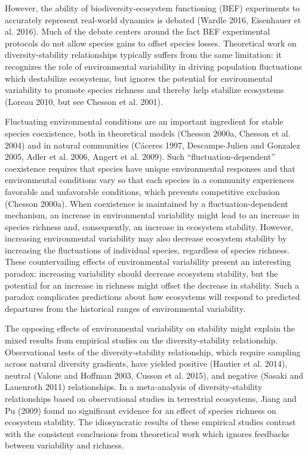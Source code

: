 \documentclass[12pt,]{article}
\begin{document}
However, the ability of biodiversity-ecosystem functioning (BEF)
experiments to accurately represent real-world dynamics is debated
(Wardle 2016, Eisenhauer et al. 2016). Much of the debate centers around
the fact BEF experimental protocols do not allow species gains to offset
species losses. Theoretical work on diversity-stability relationships
typically suffers from the same limitation: it recognizes the role of
environmental variability in driving population fluctuations which
destabilize ecosystems, but ignores the potential for environmental
variability to promote species richness and thereby help stabilize
ecosystems (Loreau 2010, but see Chesson et al. 2001).

Fluctuating environmental conditions are an important ingredient for
stable species coexistence, both in theoretical models (Chesson 2000a,
Chesson et al. 2004) and in natural communities (C{á}ceres 1997,
Descamps-Julien and Gonzalez 2005, Adler et al. 2006, Angert et al.
2009). Such ``fluctuation-dependent'' coexistence requires that species
have unique environmental responses and that environmental conditions
vary so that each species in a community experiences favorable and
unfavorable conditions, which prevents competitive exclusion (Chesson
2000a). When coexistence is maintained by a fluctuation-dependent
mechanism, an increase in environmental variability might lead to an
increase in species richness and, consequently, an increase in ecosystem
stability. However, increasing environmental variability may also
decrease ecosystem stability by increasing the fluctuations of
individual species, regardless of species richness. These countervailing
effects of environmental variability present an interesting paradox:
increasing variability should decrease ecosystem stability, but the
potential for an increase in richness might offset the decrease in
stability. Such a paradox complicates predictions about how ecosystems
will respond to predicted departures from the historical ranges of
environmental variability.

The opposing effects of environmental variability on stability might
explain the mixed results from empirical studies on the
diversity-stability relationship. Observational tests of the
diversity-stability relationship, which require sampling across natural
diversity gradients, have yielded positive (Hautier et al. 2014),
neutral (Valone and Hoffman 2003, Cusson et al. 2015), and negative
(Sasaki and Lauenroth 2011) relationships. In a meta-analysis of
diversity-stability relationships based on observational studies in
terrestrial ecosystems, Jiang and Pu (2009) found no significant
evidence for an effect of species richness on ecosystem stability. The
idiosyncratic results of these empirical studies contrast with the
consistent conclusions from theoretical work which ignores feedbacks
between variability and richness.
\end{document}
